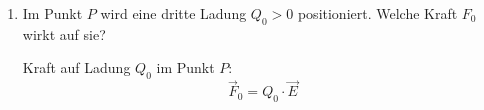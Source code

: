 {\begin{enumerate}[label=\alph*)]
\noindent
Analog folgt für die $y$-Komponenten:
$$
\begin{aligned}
E_{1y} &= E_1\sin(60^\circ)=\frac{\sqrt{3}}{2}E_1,\\
E_{2y} &= E_2\sin(60^\circ)=\frac{\sqrt{3}}{2}E_2,\\
E_y &= E_{1y}+E_{2y}=\frac{\sqrt{3}}{2}\left(E_1+E_2\right)
= \frac{3\sqrt{3}\,Q}{8\pi\varepsilon_0 a^2}.
\end{aligned}
$$

\noindent
Damit ergibt sich die resultierende Feldstärke:
$$
\vec{E}=E_x\,\vec{e}_x+E_y\,\vec{e}_y
=
-\frac{Q}{8\pi\varepsilon_0 a^2}\,\vec{e}_x
+\frac{3\sqrt{3}\,Q}{8\pi\varepsilon_0 a^2}\,\vec{e}_y.
$$






  \item Im Punkt $P$ wird eine dritte Ladung $Q_0 > 0$ positioniert. Welche Kraft $F_0$ wirkt auf sie?
  
  Kraft auf Ladung $Q_0$ im Punkt $P$:
$$
\vec{F}_0 = Q_0 \cdot \vec{E}
$$
\end{enumerate}
}